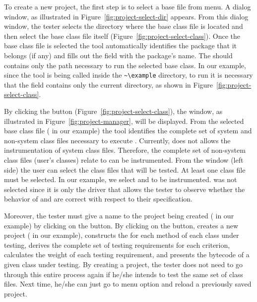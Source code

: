 To create a new project, the first step is to select a base
 file from  menu. A
dialog window, as illustrated in
Figure~\ref{fig:project-select-dir} appears. From this dialog
window, the tester selects the directory where the base class file
is located and then select the base class file itself
(Figure~\ref{fig:project-select-class}). Once the base class file
is selected the tool automatically identifies the package that it
belongs (if any) and fills out the  field with the
package's name. The  should contains only the path
necessary to run the selected base class. In our example, since
the tool is being called inside the \verb+~\example+ directory, to
run  it is necessary that the
 field contains only the current directory, as shown
in Figure~\ref{fig:project-select-class}.



By clicking the  button
(Figure~\ref{fig:project-select-class}), the 
window, as illustrated in Figure~\ref{fig:project-manager}, will
be displayed. From the selected base class file (
in our example) the tool identifies the complete set of system and
non-system class files necessary to execute .
Currently, \toolname does not allows the instrumentation of system
class files. Therefore, the complete set of non-system class files
(user's classes) relate to  can be instrumented.
From the  window (left side) the user can
select the class files that will be tested. At least one class
file must be selected. In our example, we select
 and  to be instrumented.
 was not selected since it is only the driver that
allows the tester to observe whether the behavior of
 and  are correct with respect to
their specification.



Moreover, the tester must give a name to the project being created
( in our example) by clicking on the
 button. By clicking on the  button, \toolname
creates a new project ( in our example),
constructs the \DUG for each method of each class under testing,
derives the complete set of testing requirements for each
criterion, calculates the weight of each testing requirement, and
presents the bytecode of a given class under testing. By creating
a project, the tester does not need to go through this entire
process again if he/she intends to test the same set of class
files. Next time, he/she can just go to  menu option and reload a previously saved project.

